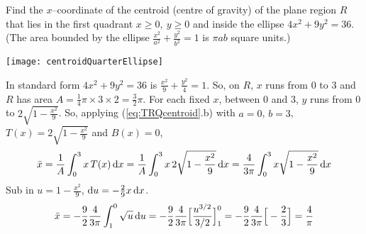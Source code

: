 \begin{eg}\label{eq:TRQcentroidA}
 Find the $x$--coordinate of the centroid (centre of gravity)
of the plane region $R$ that lies in the first quadrant $x\ge 0, \ y\ge
0$ and inside the ellipse $4x^2+9y^2=36$. (The area bounded by the ellipse
$\frac{x^2}{a^2}+\frac{y^2}{b^2}=1$ is $\pi ab$ square units.)

\begin{efig}
\begin{center}
    \texttt{[image: centroidQuarterEllipse]}
\end{center}
\end{efig}

\soln In standard form $4x^2+9y^2=36$ is $\frac{x^2}{9}+\frac{y^2}{4}=1$.
So, on $R$, $x$ runs from $0$ to $3$ and $R$ has area
$A=\frac{1}{4}\pi\times 3\times 2=\frac{3}{2}\pi$. For each fixed $x$,
between $0$ and $3$, $y$ runs from $0$ to $2\sqrt{1-\frac{x^2}{9}}$.
So, applying (\ref{eq:TRQcentroid}.b) with $a=0$, $b=3$,
$T(x)=2\sqrt{1-\frac{x^2}{9}}$ and $B(x)=0$,
\begin{equation*}
\bar x =\frac{1}{A}\int_0^3 x\,T(x)\,\mathrm{d}x
=\frac{1}{A}\int_0^3 x\,2\sqrt{1-\frac{x^2}{9}}\,\mathrm{d}x
=\frac{4}{3\pi}\int_0^3 x\sqrt{1-\frac{x^2}{9}}\,\mathrm{d}x
\end{equation*}
Sub in $u=1-\frac{x^2}{9}$, $\mathrm{d}u=-\frac{2}{9}x\,\mathrm{d}x$.
\begin{equation*}
\bar x
=-\frac{9}{2}\frac{4}{3\pi}\int_1^0 \sqrt{u}\,\mathrm{d}u
=-\frac{9}{2}\frac{4}{3\pi}\Big[\frac{u^{3/2}}{3/2}\Big]_1^0
=-\frac{9}{2}\frac{4}{3\pi}\Big[-\frac{2}{3}\Big]
=\frac{4}{
\pi}
\end{equation*}
\end{eg}

